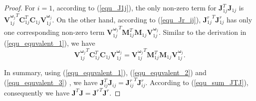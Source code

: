 \documentclass{vgtc}                          %
\begin{document}
\begin{proof}
	For $i = 1$, according to (\ref{equ_J1j}), the only  non-zero term for $\mathbf{J}_{1j}^{T}\mathbf{J}_{1j}$   is ${\bm{V}^{{\bm{\omega}}_{j}}_{1j}}^{T}\mathbf{C}_{1j}^{T}\mathbf{C}_{1j}\bm{V}^{{\bm{\omega}}_{j}}_{1j}$. On the other hand, according to (\ref{equ_Jr_ij}), ${\mathbf{J}_{1j}^{r}}^{T}\mathbf{J}_{1j}^{r}$ has only one corresponding non-zero term ${\bm{V}^{{\bm{\omega}}_{j}}_{1j}}^{T}\mathbf{M}_{1j}^{T}\mathbf{M}_{1j}\bm{V}^{{\bm{\omega}}_{j}}_{1j} $. Similar to the derivation  in (\ref{equ_equvalent_1}), we have 
	\begin{equation} \label{equ_equvalent_3}
		{\bm{V}^{{\bm{\omega}}_{j}}_{1j}}^{T}\mathbf{C}_{1j}^{T}\mathbf{C}_{1j}\bm{V}^{{\bm{\omega}}_{j}}_{1j} = {\bm{V}^{{\bm{\omega}}_{j}}_{1j}}^{T}\mathbf{M}_{1j}^{T}\mathbf{M}_{1j}\bm{V}^{{\bm{\omega}}_{j}}_{1j}.
	\end{equation}
	
	In summary, %
	using (\ref{equ_equvalent_1}),  (\ref{equ_equvalent_2}) and (\ref{equ_equvalent_3}) , we have $\mathbf{J}_{ij}^{T}\mathbf{J}_{ij} = {\mathbf{J}_{ij}^{r}}^{T}\mathbf{J}_{ij}^{r}$. According to (\ref{equ_sum_JTJ}), consequently we have $\mathbf{J}^{T}\mathbf{J} = {\mathbf{J}^{r}}^{T}\mathbf{J}^{r}$.
\end{proof}
\end{document}
